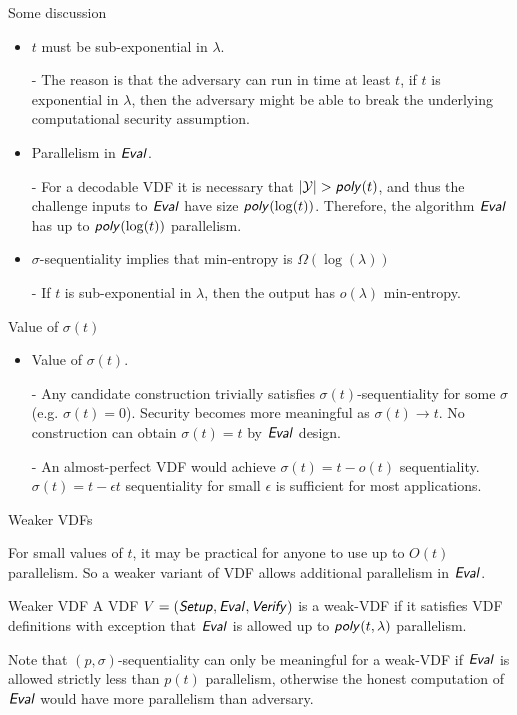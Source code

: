\documentclass[UTF8]{beamer}
\begin{document}
	\begin{frame}{Some discussion}
		\begin{itemize}
			\item $t$ must be sub-exponential in $\lambda$.
			\item [-] The reason is that the adversary can run in time at least $t$, if $t$ is exponential in $\lambda$, then the adversary might be able to break the underlying computational security assumption.
			\item Parallelism in $\textsf{\textit{Eval}}$.
			\item [-] For a decodable VDF it is necessary that $|\cY|>\poly(t)$, and thus the challenge inputs to $\textsf{\textit{Eval}}$ have size $\textsf{\textit{poly}}(\log(t))$. Therefore, the algorithm $\textsf{\textit{Eval}}$ has up to $\textsf{\textit{poly}}(\log(t))$ parallelism.
			\item $\sigma$-sequentiality implies that min-entropy is $\Omega(\log(\lambda))$
			\item [-] If $t$ is sub-exponential in $\lambda$, then the output has $o(\lambda)$ min-entropy.
		\end{itemize}
	\end{frame}
	\begin{frame}{Value of $\sigma(t)$}
		\begin{itemize}
			\item Value of $\sigma(t)$.
			\item [-] Any candidate construction trivially satisfies $\sigma(t)$-sequentiality for some $\sigma$ (e.g. $\sigma(t)=0$). Security becomes more meaningful as $\sigma(t)\to t$. No construction can obtain $\sigma(t)=t$ by $\textsf{\textit{Eval}}$ design.
			\item [-] An almost-perfect VDF would achieve $\sigma(t)=t-o(t)$ sequentiality. $\sigma(t)=t-\epsilon t$ sequentiality for small $\epsilon$ is sufficient for most applications.
		\end{itemize}
	\end{frame}
	\begin{frame}{Weaker VDFs}
		\begin{block}{}
			For small values of $t$, it may be practical for anyone to use up to $O(t)$ parallelism. So a weaker variant of VDF allows additional parallelism in $\textsf{\textit{Eval}}$.
		\end{block}
		\begin{block}{Weaker VDF}
			A VDF $V=(\textsf{\textit{Setup}},\textsf{\textit{Eval}},\textsf{\textit{Verify}})$ is a weak-VDF if it satisfies VDF definitions with exception that $\textsf{\textit{Eval}}$ is allowed up to $\textsf{\textit{poly}}(t,\lambda)$ parallelism.
		\end{block}
		\begin{block}{}
			Note that $(p,\sigma)$-sequentiality can only be meaningful for a weak-VDF if $\textsf{\textit{Eval}}$ is allowed strictly less than $p(t)$ parallelism, otherwise the honest computation of $\textsf{\textit{Eval}}$ would have more parallelism than adversary.
		\end{block}
	\end{frame}
\end{document}
